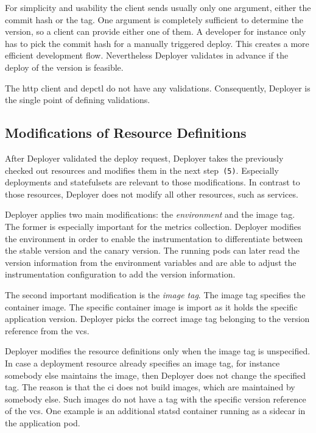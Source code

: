 For simplicity and usability the client sends usually only one argument, either the commit
hash or the tag. One argument is completely sufficient to determine the version, so a
client can provide either one of them. A developer for instance only has to pick the
commit hash for a manually triggered deploy. This creates a more efficient development
flow. Nevertheless Deployer validates in advance if the deploy of the version is feasible.

The http client and depctl do not have any validations. Consequently, Deployer is the
single point of defining validations.

\subsection{Modifications of Resource Definitions}

After Deployer validated the deploy request, Deployer takes the previously checked out
resources and modifies them in the next step~\texttt{(5)}. Especially deployments and
statefulsets are relevant to those modifications. In contrast to those resources, Deployer
does not modify all other resources, such as services.

Deployer applies two main modifications: the \emph{environment} and the image tag. The
former is especially important for the metrics collection. Deployer modifies the
environment in order to enable the instrumentation to differentiate between the stable
version and the canary version. The running pods can later read the version information
from the environment variables and are able to adjust the instrumentation configuration to
add the version information.

The second important modification is the \emph{image tag}. The image tag specifies the
container image. The specific container image is import as it holds the specific
application version. Deployer picks the correct image tag belonging to the version
reference from the \gls{vcs}.

Deployer modifies the resource definitions only when the image tag is unspecified. In case
a deployment resource already specifies an image tag, for instance somebody else maintains
the image, then Deployer does not change the specified tag. The reason is that the
\gls{ci} does not build images, which are maintained by somebody else. Such images do not
have a tag with the specific version reference of the \gls{vcs}. One example is an
additional statsd container running as a sidecar in the application pod.

